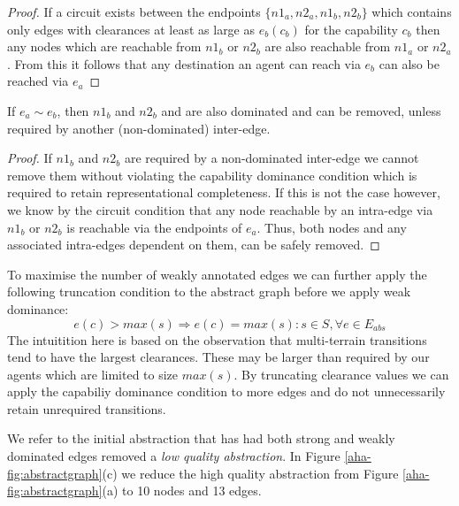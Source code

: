 \begin{proof}
If a circuit exists between the endpoints $\lbrace n1_{a}, n2_{a}, n1_{b}, n2_{b} \rbrace$ which contains only edges with clearances at least as large as $e_{b}(c_{b})$ for the capability $c_{b}$ then any nodes which are reachable from $n1_{b}$ or $n2_{b}$ are also reachable from $n1_{a}$ or $n2_{a}$.
From this it follows that any destination an agent can reach via $e_{b}$ can also be reached via $e_{a}$ 
\end{proof}
\begin{corollary}
If $e_{a} \sim e_{b}$, then $n1_{b}$ and $n2_{b}$ and are also dominated and can be removed, unless required by another (non-dominated) inter-edge. 
\end{corollary}
\begin{proof}
If $n1_{b}$ and $n2_{b}$ are required by a non-dominated inter-edge we cannot remove them without violating the capability dominance condition which is required to retain representational completeness. 
If this is not the case however, we know by the circuit condition that any node reachable by an intra-edge via $n1_{b}$ or $n2_{b}$ is reachable via the endpoints of $e_{a}$. 
Thus, both nodes and any associated intra-edges dependent on them, can be safely removed.
\end{proof}
To maximise the number of weakly annotated edges we can further apply the following truncation condition to the abstract graph before we apply weak dominance:
\begin{equation}
e(c) > max(s) \Rightarrow e(c) = max(s) : s \in S, \forall e \in E_{abs}
\end{equation}
The intuitition here is based on the observation that multi-terrain transitions tend to have the largest clearances. 
These may be larger than required by our agents which are limited to size $max(s)$. 
By truncating clearance values we can apply the capabiliy dominance condition to more edges and do not unnecessarily retain unrequired transitions.
\par \indent
We refer to the initial abstraction that has had both strong and weakly dominated edges removed a \emph{low quality abstraction}.
In Figure \ref{aha-fig:abstractgraph}(c) we reduce the high quality abstraction from Figure \ref{aha-fig:abstractgraph}(a) to 10 nodes and 13 edges.
